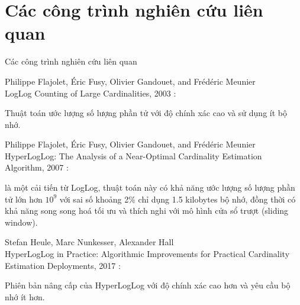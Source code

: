 \documentclass[10pt]{beamer}
\newcommand{\SubItem}[1]{
    {\setlength\itemindent{15pt} \item[-] #1}
}
\begin{document}
\section{Các công trình nghiên cứu liên quan}
\begin{frame}{Các công trình nghiên cứu liên quan}
\begin{itemize}
	\item Philippe Flajolet, Éric Fusy, Olivier Gandouet, and Frédéric Meunier\\ LogLog Counting of Large Cardinalities, 2003 \cite{durand2003loglog}: 
	\SubItem{Thuật toán ước lượng số lượng phần tử với độ chính xác cao và sử dụng ít bộ nhớ.}
	\item Philippe Flajolet, Éric Fusy, Olivier Gandouet, and Frédéric Meunier\\ HyperLogLog: The Analysis of a Near-Optimal Cardinality Estimation Algorithm, 2007 \cite{flajolet2007hyperloglog}: 
	\SubItem{là một cải tiến từ LogLog, thuật toán này có khả năng ước lượng số lượng phần tử lớn hơn $10^9$ với sai số khoảng 2\% chỉ dụng 1.5 kilobytes bộ nhớ, đồng thời có khả năng song song hoá tối ưu và thích nghi với mô hình cửa sổ trượt (sliding window).}
	\item Stefan Heule, Marc Nunkesser, Alexander Hall\\ HyperLogLog in Practice: Algorithmic Improvements for Practical Cardinality Estimation Deployments, 2017 \cite{heule2013hyperloglog}: 
	\SubItem{Phiên bản nâng cấp của HyperLogLog với độ chính xác cao hơn và yêu cầu bộ nhớ ít hơn.}
\end{itemize}
\end{frame}
\end{document}
